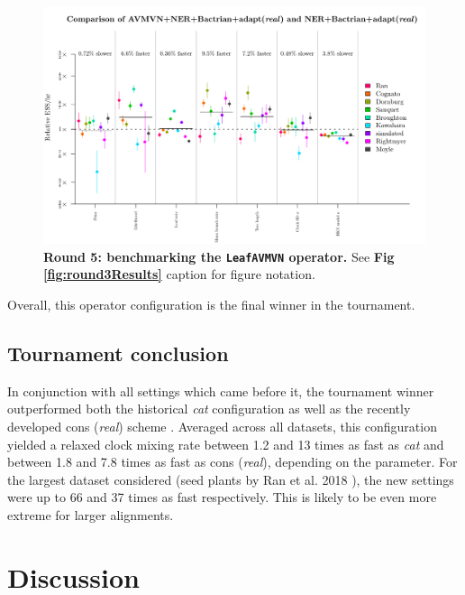 \documentclass[10pt,letterpaper]{article}
\begin{document}
\begin{figure}[!h]
\includegraphics[width=\textwidth]{benchmarking/benchmarkingVM/ESS_round5.pdf}
\caption{\textbf{Round 5: benchmarking the \texttt{LeafAVMVN} operator.} See \textbf{Fig \ref{fig:round3Results}} caption for figure notation.  }
\label{fig:round5Results}
\end{figure}



Overall, this operator configuration is the final winner in the tournament.



\subsection*{Tournament conclusion}
 In conjunction with all settings which came before it, the tournament winner  outperformed both the historical \textit{cat} configuration \cite{drummond2006relaxed} as well as the recently developed cons (\textit{real}) scheme \cite{zhang2020improving} .
Averaged across all datasets, this configuration yielded a relaxed clock  mixing rate between 1.2 and 13 times as fast as \textit{cat} and between 1.8 and 7.8 times as fast as cons (\textit{real}), depending on the parameter.
For the largest dataset considered (seed plants by Ran et al. 2018 \cite{Ran_2018}), the new settings were up to 66 and 37 times as fast respectively.
This is likely to be even more extreme for larger alignments.



\section*{Discussion} \label{sect:discussion}
\end{document}
